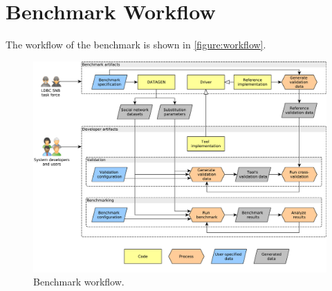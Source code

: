 
\section{Benchmark Workflow}
\label{section:workflow}

The workflow of the benchmark is shown in \autoref{figure:workflow}.

\begin{figure}[htb]
	\centering
	\includegraphics[width=\linewidth]{figures/workflow}
	\caption{Benchmark workflow.}
	\label{figure:workflow}
\end{figure}
